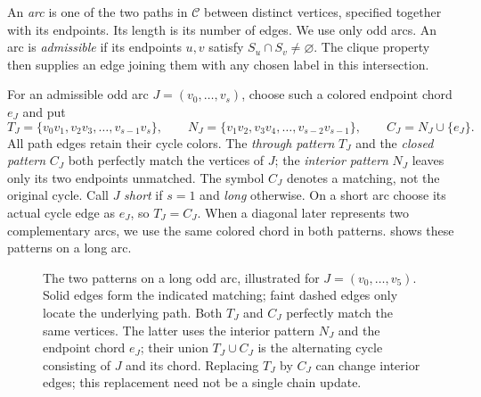 \documentclass[11pt]{article}
\theoremstyle{definition}
\theoremstyle{remark}
\numberwithin{equation}{section}
\begin{document}
An \emph{arc} is one of the two paths in $\mathcal C$ between distinct
vertices, specified together with its endpoints. Its length is its
number of edges. We use only odd arcs. An arc is \emph{admissible} if
its endpoints $u,v$ satisfy $S_u\cap S_v\ne\varnothing$. The clique
property then supplies an edge joining them with any chosen label in
this intersection.

For an admissible odd arc $J=(v_0,\ldots,v_s)$, choose such a colored
endpoint chord $e_J$ and put
\[
 T_J=\{v_0v_1,v_2v_3,\ldots,v_{s-1}v_s\},\qquad
 N_J=\{v_1v_2,v_3v_4,\ldots,v_{s-2}v_{s-1}\},
 \qquad C_J=N_J\cup\{e_J\}.
\]
All path edges retain their cycle colors. The \emph{through pattern}
$T_J$ and the \emph{closed pattern} $C_J$ both perfectly match the
vertices of $J$; the \emph{interior pattern} $N_J$ leaves only its
two endpoints unmatched. The symbol $C_J$ denotes a matching, not the
original cycle. Call $J$ \emph{short} if $s=1$ and \emph{long} otherwise.
On a short arc choose its actual cycle edge as $e_J$, so $T_J=C_J$.
When a diagonal later represents two complementary arcs, we use the
same colored chord in both patterns.  shows
these patterns on a long arc.

\begin{figure}[ht]
\centering
{}
\caption{The two patterns on a long odd arc, illustrated for
$J=(v_0,\ldots,v_5)$. Solid edges form the indicated matching;
faint dashed edges only locate the underlying path. Both $T_J$ and
$C_J$ perfectly match the same vertices. The latter uses the interior
pattern $N_J$ and the endpoint chord $e_J$; their union
$T_J\cup C_J$ is the alternating cycle consisting of $J$ and its chord.
Replacing $T_J$ by $C_J$ can change interior edges; this replacement
need not be a single chain update.}
\label{fig:odd-arc-patterns}
\end{figure}
\end{document}
